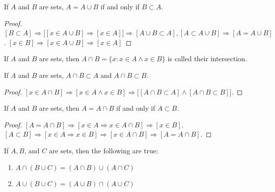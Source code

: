 \documentclass[crop=false,class=book,oneside]{standalone}
\begin{document}
            \begin{theorem}
                If $A$ and $B$ are sets, $A=A\cup B$
                if and only if $B\subset A$.
            \end{theorem}
            \begin{proof}
                $[B\subset A]\Rightarrow\big[[x\in A\cup B]%
                 \Rightarrow[x\in A]\big]%
                 \Rightarrow[A\cup B \subset A],[A\subset A\cup B]%
                 \Rightarrow[A=A\cup B]$.
                $[x\in B] \Rightarrow [x\in A\cup B]%
                 \Rightarrow [x\in A]$
            \end{proof}
            \begin{definition}
                If $A$ and $B$ are sets, then
                $A\cap{B}=\{x:x\in{A}\land{x}\in{B}\}$
                is called their intersection.
            \end{definition}
            \begin{corollary}
                If $A$ and $B$ are sets,
                $A\cap{B}\subset{A}$ and $A\cap{B}\subset{B}$.
            \end{corollary}
            \begin{proof}
                $[x\in A\cap B]\Rightarrow[x\in A\land x\in B]%
                 \Rightarrow\big[[A\cap B \subset A]%
                 \land[A\cap B \subset B]\big]$.
            \end{proof}
            \begin{theorem}
                If $A$ and $B$ are sets, then $A=A\cap{B}$
                if and only if $A\subset{B}$.
            \end{theorem}
            \begin{proof}
            $[A=A\cap B]\Rightarrow [x\in A\Rightarrow x\in A \cap B]\Rightarrow [x\in B]$. $[A\subset B]\Rightarrow [x\in A\Rightarrow x\in B]\Rightarrow [x\in A\cap B]\Rightarrow [A=A\cap B]$.
            \end{proof}
            \begin{theorem}
            If $A,B$, and $C$ are sets, then the following are true:
            \begin{enumerate}
            \item $A\cap (B\cup C) = (A\cap B)\cup (A\cap C)$
            \item $A\cup (B\cup C) = (A\cup B)\cap (A\cup C)$
            \end{enumerate}
            \end{theorem}
\end{document}
